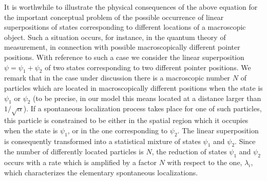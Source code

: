 \documentclass[12pt]{article}
\begin{document}
It is worthwhile to illustrate the physical consequences of the
above equation for the important conceptual problem of the
possible occurrence of linear superpositions of states
corresponding to different locations of a macroscopic object. Such
a situation occurs, for instance, in the quantum theory of
measurement, in connection with possible macroscopically different
pointer positions. With reference to such a case we consider the
linear superposition $\psi = \psi_{1} + \psi_{2}$ of two states
corresponding to two different pointer positions. We remark that
in the case under discussion there is a macroscopic number $N$  of
particles which are located in macroscopically different positions
when the state is $\psi_{1}$ or $\psi_{2}$ (to be precise, in our
model this means located at a distance larger than
$1/\sqrt{\alpha}$). If a spontaneous localization process takes
place for one of such particles, this particle is constrained to
be either in the spatial region which it occupies when the state
is $\psi_{1}$, or in the one corresponding to $\psi_{2}$. The
linear superposition is consequently transformed into a
statistical mixture of states $\psi_{1}$ and $\psi_{2}$. Since the
number of differently located particles is $N$, the reduction of
states $\psi_{1}$ and $\psi_{2}$ occurs with a rate which is
amplified by a factor $N$ with respect to the one, $\lambda_{i}$,
which characterizes the elementary spontaneous localizations.
\end{document}
